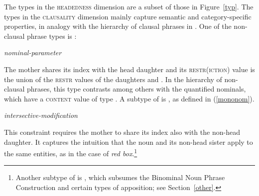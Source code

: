 \documentclass[output=paper
	        ,collection
	        ,collectionchapter
 	        ,biblatex
                ,babelshorthands
                ,newtxmath
                ,draftmode
                ,colorlinks, citecolor=brown
]{langscibook}
\begin{document}
The types in the \textsc{headedness} dimension are a subset of those in Figure~\ref{typ}.  
The types in the \textsc{clausality} dimension mainly capture semantic and 
category-specific properties, in analogy with the hierarchy of clausal phrases 
in \citet{GS00}. One of the non-clausal phrase types is : 

\ea
\label{param} 
\emph{nominal-parameter} \impl\\
\z

\noindent
The mother shares its index with the head daughter  and 
its \textsc{restr(iction)} value is the union of the \textsc{restr} values 
of the daughters  and . 
In the hierarchy of non-clausal phrases, this type contrasts among others with 
the quantified nominals, which have a \textsc{content} value of type 
 \citep[203--205]{GS00}. A subtype of  is  
, as defined in (\ref{mononom}).

\ea
\label{mononom} 
\emph{intersective-modification} \impl\\
\z

\noindent 
This constraint requires the mother to share its index also with the 
non-head daughter. It captures the intuition that the 
noun and its non-head sister apply to the same entities, as in 
the case of \emph{red box}.\footnote{Another subtype of  
is , which subsumes 
the Binominal Noun Phrase Construction and certain types of apposition;
see Section~\ref{other}.}  
\end{document}
